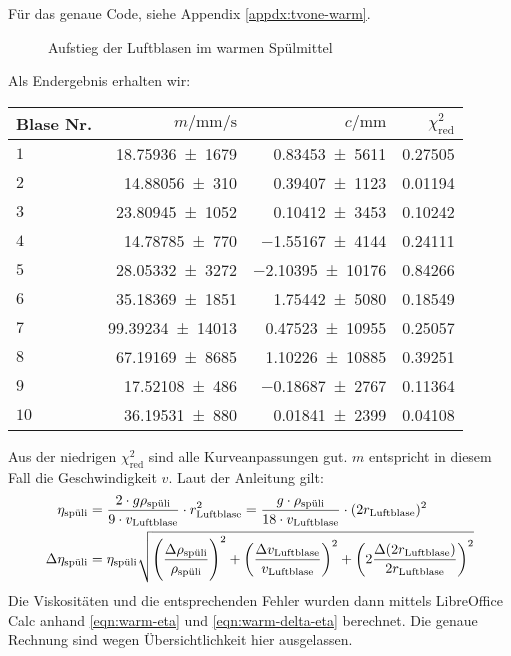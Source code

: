 		Für das genaue \gnuplot{} Code, siehe Appendix \ref{appdx:tvone-warm}. 
		\begin{figure}[H]
			\centering
			\captionsetup{width=0.8\textwidth, justification=centering}
			\resizebox{\linewidth}{!}{}
			\caption{Aufstieg der Luftblasen im warmen Spülmittel }
			\vspace{-1em}
		\end{figure}
		Als Endergebnis erhalten wir:
		\begin{center}
			\begin{tabular}{lrrr}
				\toprule
				Blase Nr. & $m/\si{\milli\meter\per\second}$ & $c/\si{\milli\meter}$ & $\chi^2_\text{red}$ \\
				\midrule
					$1$ &  \num{18,75936(1679)} & \num{0,83453(5611)} & \num{0,27505} \\
					$2$ &  \num{14,88056(310)} & \num{0,39407(1123)} & \num{0,01194} \\
					$3$ &  \num{23,80945(1052)} & \num{0,10412(3453)} & \num{0,10242} \\
					$4$ &  \num{14,78785(770)} & \num{-1,55167(4144)} & \num{0,24111} \\
					$5$ &  \num{28,05332(3272)} & \num{-2,10395(10176)} & \num{0,84266} \\
					$6$ &  \num{35,18369(1851)} & \num{1,75442(5080)} & \num{0,18549} \\
					$7$ &  \num{99,39234(14013)} & \num{0,47523(10955)} & \num{0,25057} \\
					$8$ &  \num{67,19169(8685)} & \num{1,10226(10885)} & \num{0,39251} \\
					$9$ &  \num{17,52108(486)} & \num{-0,18687(2767)} & \num{0,11364} \\
					$10$ & \num{36,19531(880)} & \num{0,01841(2399)} & \num{0,04108} \\
				\bottomrule
			\end{tabular}
		\end{center}
		Aus der niedrigen $\chi^2_\text{red}$ sind alle Kurveanpassungen gut. $m$ entspricht in diesem Fall die Geschwindigkeit $v$.
		Laut der Anleitung gilt:
		\begin{align}
			\eta_\spuli &= \frac{2\cdot g\rho_\spuli}{9\cdot v_\text{Luftblase}}\cdot r^2_\text{Luftblase} = \frac{g\cdot \rho_\spuli}{18\cdot v_\text{Luftblase}}\cdot (2r_\text{Luftblase})^2 \label{eqn:warm-eta} \\
			\Delta \eta_\spuli &= \eta_\spuli \sqrt{
				\left(\frac{\Delta \rho_\spuli}{\rho_\spuli}\right)^2 +
				\left(\frac{\Delta v_\text{Luftblase}}{v_\text{Luftblase}}\right)^2 +
				\left(2\frac{\Delta (2r_\text{Luftblase})}{2r_\text{Luftblase}}\right)^2
			} \label{eqn:warm-delta-eta}
		\end{align}
		Die Viskositäten und die entsprechenden Fehler wurden dann mittels LibreOffice Calc anhand \eqref{eqn:warm-eta} und \eqref{eqn:warm-delta-eta} berechnet. Die genaue Rechnung sind wegen Übersichtlichkeit hier ausgelassen.

